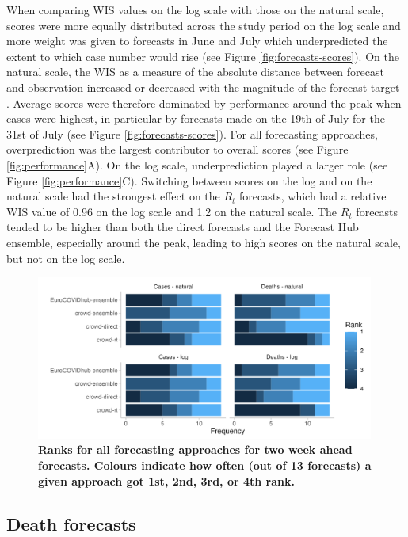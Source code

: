 \documentclass[10pt,a4paper,twocolumn]{article}
\begin{document}
When comparing WIS values on the log scale with those on the natural scale, scores were more equally distributed across the study period on the log scale and more weight was given to forecasts in June and July which underpredicted the extent to which case number would rise (see Figure \ref{fig:forecasts-scores}).
On the natural scale, the WIS as a measure of the absolute distance between forecast and observation increased or decreased with the magnitude of the forecast target \cite{bosseTransformationForecastsEvaluating2023, bracherEvaluatingEpidemicForecasts2021}. Average scores were therefore dominated by performance around the peak when cases were highest, in particular by forecasts made on the 19th of July for the 31st of July (see Figure \ref{fig:forecasts-scores}). For all forecasting approaches, overprediction was the largest contributor to overall scores (see Figure \ref{fig:performance}A). On the log scale, underprediction played a larger role (see Figure \ref{fig:performance}C). Switching between scores on the log and on the natural scale had the strongest effect on the $R_t$ forecasts, which had a relative WIS value of 0.96 on the log scale and 1.2 on the natural scale. The $R_t$ forecasts tended to be higher than both the direct forecasts and the Forecast Hub ensemble, especially around the peak, leading to high scores on the natural scale, but not on the log scale. 

\begin{figure}
\centering
\includegraphics[width=0.99\textwidth]{../output/figures/performance-ranks.png}
\caption{\bf{Ranks for all forecasting approaches for two week ahead forecasts}. Colours indicate how often (out of 13 forecasts) a given approach got 1st, 2nd, 3rd, or 4th rank.}
\label{fig:performance-ranks}
\end{figure}

\subsection*{Death forecasts} 
\end{document}
